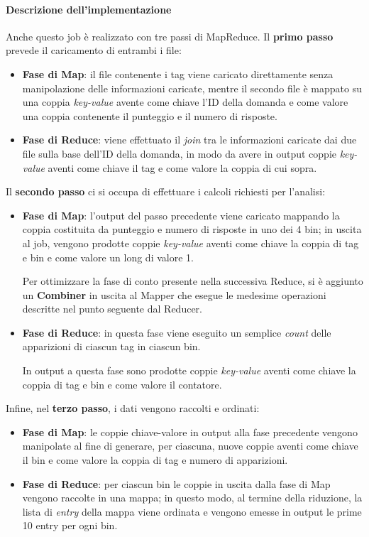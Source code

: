  \paragraph{Descrizione dell'implementazione}\label{par:job2:mapreduce:implementation}

  Anche questo job è realizzato con tre passi di MapReduce.
  Il \textbf{primo passo} prevede il caricamento di entrambi i file:
  \begin{itemize}
    \item
    \textbf{Fase di Map}:
      il file contenente i tag viene caricato direttamente senza manipolazione delle informazioni caricate,
      mentre il secondo file è mappato su una coppia \textit{key-value} avente come chiave l'ID della domanda
      e come valore una coppia contenente il punteggio e il numero di risposte.

    \item
      \textbf{Fase di Reduce}:
      viene effettuato il \textit{join} tra le informazioni caricate dai due file sulla base dell'ID della domanda,
      in modo da avere in output coppie \textit{key-value} aventi come chiave il tag e come valore la coppia di cui sopra.
  \end{itemize}

  Il \textbf{secondo passo} ci si occupa di effettuare i calcoli richiesti per l'analisi:
  \begin{itemize}
    \item
      \textbf{Fase di Map}:
      l'output del passo precedente viene caricato mappando la coppia costituita da punteggio e numero di risposte in uno dei 4 bin;
      in uscita al job, vengono prodotte coppie \textit{key-value} aventi come chiave la coppia di tag e bin e come valore un long di valore 1.

      Per ottimizzare la fase di conto presente nella successiva Reduce, si è aggiunto un \textbf{Combiner} in uscita al Mapper che esegue le medesime operazioni
      descritte nel punto seguente dal Reducer.
    \item
      \textbf{Fase di Reduce}:
      in questa fase viene eseguito un semplice \textit{count} delle apparizioni di ciascun tag in ciascun bin.

      In output a questa fase sono prodotte coppie \textit{key-value} aventi come chiave la coppia di tag e bin e come valore il contatore.
  \end{itemize}

  Infine, nel \textbf{terzo passo}, i dati vengono raccolti e ordinati:
  \begin{itemize}
    \item
      \textbf{Fase di Map}:
      le coppie chiave-valore in output alla fase precedente vengono manipolate
      al fine di generare, per ciascuna, nuove coppie aventi come chiave il bin e come valore la coppia di tag e numero di apparizioni.
    \item
      \textbf{Fase di Reduce}:
      per ciascun bin le coppie in uscita dalla fase di Map vengono raccolte in una mappa;
      in questo modo, al termine della riduzione, la lista di \textit{entry} della mappa viene ordinata e vengono emesse in output le prime 10 entry per ogni bin.
  \end{itemize}

